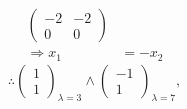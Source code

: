 \documentclass[12pt, letterpaper]{article}
\begin{document}
\begin{enumerate}
\begin{equation*}
\begin{aligned}
            \begin{pmatrix}
                -2 & -2 \\
                0 & 0
            \end{pmatrix} \\
            \Rightarrow x_{1} & = -x_{2}
        \end{aligned}
    \end{equation*}
    \begin{equation*}
        \therefore 
        \begin{pmatrix}
            1 \\
            1
        \end{pmatrix}_{\lambda = 3}
        \land 
        \begin{pmatrix}
            -1 \\
            1
        \end{pmatrix}_{\lambda = 7},
    \end{equation*}
\end{enumerate}

\newpage
\end{document}
